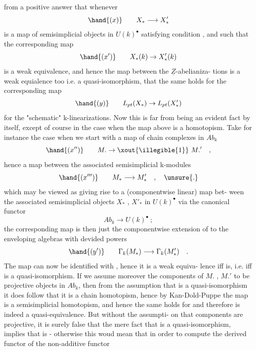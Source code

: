 
from a positive answer that whenever
\[ \hand{(x)} \qquad X_* \longrightarrow X'_* \]
is a map of semisimplicial objects in $U(k)^\bullet$ satisfying condition ,
and such that the corresponding map
\[ \hand{(x')} \qquad X_*(k) \to X'_*(k) \]
is a weak equivalence, and  hence the map between the $\underline{Z}$-abelianiza-%
tions is a weak equialence too i.e. a quasi-isomorphism, that the same
holds for the corresponding map
\[ \hand{(y)} \qquad L_{pt}(X_*) \to L_{pt}(X'_*) \]
for the "schematic" k-linearizations. Now this is far from being an
evident fact by itself, except of course in the case when the map 
above is a homotopism. Take for instance the case when we start with
a map of chain complexes in $Ab_k$
\[ \hand{(x'')} \qquad M. \to \text{\xout{\illegible{1}}}\ M.' \quad , \]
hence a map between the associated semisimplicial k-modules
\[ \hand{(x''')} \qquad M_* \longrightarrow M'_* \quad , \quad \unsure{.} \]
which may be viewed as giving rise to a (componentwise linear) map bet-%
ween the associated semisimplicial objects $X_*$ , $X'_*$ in $U(k)^\bullet$ via the
canonical functor
\[ Ab_k \longrightarrow U(k)^\bullet \ ; \]
the corresponding map  is then just the componentwise extension of
 to the enveloping algebras with devided powers
\[ \hand{(y')} \qquad \Gamma_k(M_*) \longrightarrow \Gamma_k(M'_*) \quad . \]
The map  can now be identified with  , hence it is a weak equiva-%
lence iff  is, i.e. iff  is a quasi-isomorphism. If we assume
moreover the components of $M.$ ,  $M.'$ to be projective objects in $Ab_k$,
then from the assumption that  is a quasi-isomorphism it does follow
that it is a chain homotopism, hence by Kan-Dold-Puppe the map 
is a semisimplicial homotopism, and hence the same holds for \hand{,} and
 therefore is indeed a quasi-equivalence. But without the assumpti-%
on that components are projective, it is surely false that the mere
fact that  is a quasi-isomorphism, implies that  is - otherwise
this woud mean that in order to compute the  derived functor of the
non-additive functor 

